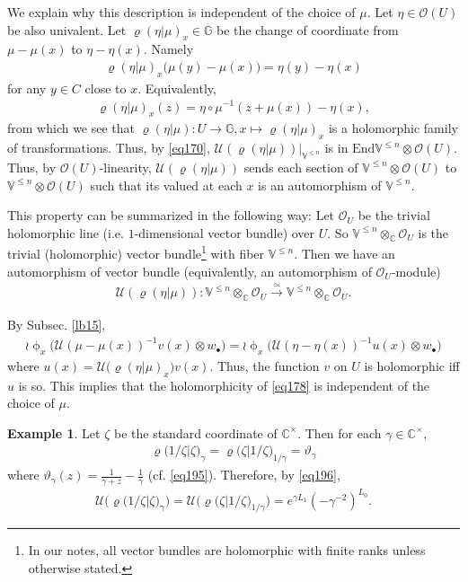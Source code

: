 \documentclass[11pt,b5paper,notitlepage]{article}
\theoremstyle{definition}
\newtheorem{eg}[df]{Example}
\theoremstyle{plain}
\newcommand{\mc}{\mathcal}
\newcommand{\End}{\mathrm{End}} %
\newcommand{\id}{\mathbf{1}}
\newcommand{\scr}{\mathscr}
\newcommand{\blt}{\bullet}
\newcommand{\Vbb}{\mathbb V}
\newcommand{\Gbb}{\mathbb G}
\newcommand{\Cbb}{\mathbb C}
\numberwithin{equation}{section}
\begin{document}
We explain why this description is independent of the choice of $\mu$. Let $\eta\in\scr O(U)$ be also univalent. Let $\varrho(\eta|\mu)_x\in\Gbb$ be the change of coordinate from $\mu-\mu(x)$ to $\eta-\eta(x)$. \index{zz@$\varrho(\alpha\lvert\id),\varrho(\eta\lvert\mu)$} Namely
\begin{align}
\varrho(\eta|\mu)_x\big(\mu(y)-\mu(x)\big)=\eta(y)-\eta(x)	\label{eq177}
\end{align}
for any $y\in C$ close to $x$. Equivalently,
\begin{align}
\varrho(\eta|\mu)_x(z)=\eta\circ\mu^{-1}(z+\mu(x))-\eta(x),\label{eq205}
\end{align}
from which we see that $\varrho(\eta|\mu):U\rightarrow\Gbb,x\mapsto\varrho(\eta|\mu)_x$ is a holomorphic family of transformations. Thus, by \eqref{eq170}, $\mc U(\varrho(\eta|\mu))\big|_{\Vbb^{\leq n}}$ is in $\End\Vbb^{\leq n}\otimes\scr O(U)$. Thus, by $\scr O(U)$-linearity, $\mc U(\varrho(\eta|\mu))$ sends each section of $\Vbb^{\leq n}\otimes\scr O(U)$ to $\Vbb^{\leq n}\otimes\scr O(U)$ such that its valued at each $x$ is an automorphism of $\Vbb^{\leq n}$. 

This property can be summarized in the following way: Let $\scr O_U$ be the trivial holomorphic line (i.e. $1$-dimensional vector bundle) over $U$. So $\Vbb^{\leq n}\otimes_\Cbb\scr O_U$ is the trivial (holomorphic) vector bundle\footnote{In our notes, all vector bundles are holomorphic with finite ranks unless otherwise stated.} with fiber $\Vbb^{\leq n}$. Then  we have an automorphism of vector bundle (equivalently, an automorphism of $\scr O_U$-module)
\begin{align*}
\mc U(\varrho(\eta|\mu)):\Vbb^{\leq n}\otimes_\Cbb \scr O_U\xrightarrow{\simeq} \Vbb^{\leq n}\otimes_\Cbb \scr O_U.	
\end{align*}




By Subsec. \ref{lb15},
\begin{align*}
\wr\upphi_x\big(\mc U(\mu-\mu(x))^{-1}v(x)\otimes w_\blt\big)=	\wr\upphi_x\big(\mc U(\eta-\eta(x))^{-1}u(x)\otimes w_\blt\big)	
\end{align*}
where $u(x)=\mc U\mc(\varrho(\eta|\mu)_x)v(x)$. Thus, the function $v$ on $U$ is holomorphic iff $u$ is so. This implies that the holomorphicity of \eqref{eq178} is independent of the choice of $\mu$.




\begin{eg}
Let $\zeta$ be the standard coordinate of $\Cbb^\times$. Then for each $\gamma\in\Cbb^\times$,
\begin{align}
\varrho\big(1/\zeta\big|\zeta\big)_\gamma=\varrho\big(\zeta\big|1/\zeta\big)_{1/\gamma}=\vartheta_\gamma
\end{align}
where $\vartheta_\gamma(z)=\frac 1{\gamma+z}-\frac 1\gamma$ (cf. \eqref{eq195}). Therefore, by \eqref{eq196},
\begin{align}
\mc U\big(\varrho\big(1/\zeta\big|\zeta\big)_\gamma\big)=\mc U\big(\varrho\big(\zeta\big|1/\zeta\big)_{1/\gamma}\big)=e^{\gamma L_1}(-\gamma^{-2})^{L_0}.\label{eq197}
\end{align}
\end{eg}
\end{document}
